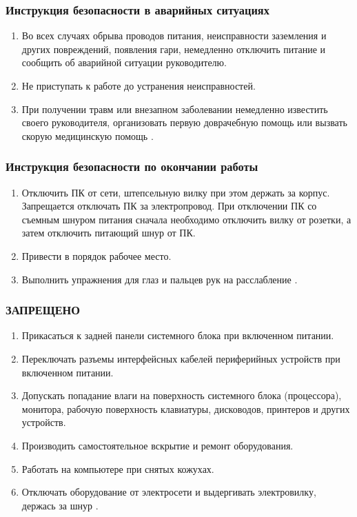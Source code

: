 \subsubsection{Инструкция безопасности в аварийных ситуациях}
\begin{enumerate}
\item Во всех случаях обрыва проводов питания, неисправности заземления и других повреждений, появления гари, немедленно отключить питание и сообщить об аварийной ситуации руководителю.
\item Не приступать к работе до устранения неисправностей.
\item При получении травм или внезапном заболевании немедленно известить своего руководителя, организовать первую доврачебную помощь или вызвать скорую медицинскую помощь \cite{bhzd_3}.
\end{enumerate}

\subsubsection{Инструкция безопасности по окончании работы}
\begin{enumerate}
\item Отключить ПК от сети, штепсельную вилку при этом держать за корпус. Запрещается отключать ПК за электропровод. При отключении ПК со съемным шнуром питания сначала необходимо отключить вилку от розетки, а затем отключить питающий шнур от ПК.
\item Привести в порядок рабочее место.
\item Выполнить упражнения для глаз и пальцев рук на расслабление \cite{bhzd_3}.
\end{enumerate}

\subsubsection{ЗАПРЕЩЕНО}
\begin{enumerate}
\item Прикасаться к задней панели системного блока при включенном питании.
\item Переключать разъемы интерфейсных кабелей периферийных устройств при включенном питании.
\item Допускать попадание влаги на поверхность системного блока (процессора), монитора, рабочую поверхность клавиатуры, дисководов, принтеров и других устройств.
\item Производить самостоятельное вскрытие и ремонт оборудования.
\item Работать на компьютере при снятых кожухах.
\item Отключать оборудование от электросети и выдергивать электровилку, держась за шнур \cite{bhzd_3}.
\end{enumerate}